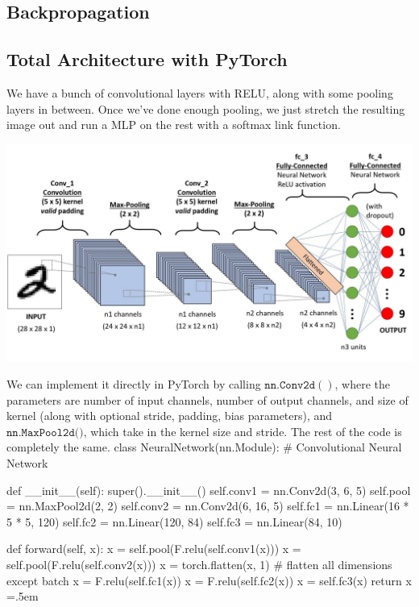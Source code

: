 \documentclass{article}
\newenvironment{cverbatim}
 {\SaveVerbatim{cverb}}
 {\endSaveVerbatim
  \flushleft\fboxrule=0pt\fboxsep=.5em
  \colorbox{cverbbg}{%
    \makebox[\dimexpr\linewidth-2\fboxsep][l]{\BUseVerbatim{cverb}}%
  }
  \endflushleft
}
\theoremstyle{definition}
\theoremstyle{remark}
\theoremstyle{definition}
\begin{document}
\subsection{Backpropagation}


\subsection{Total Architecture with PyTorch}

We have a bunch of convolutional layers with RELU, along with some pooling layers in between. Once we've done enough pooling, we just stretch the resulting image out and run a MLP on the rest with a softmax link function. 
\begin{center}
    \includegraphics[scale=0.25]{Images/CNNs/CNN_architecture.jpeg}
\end{center}

We can implement it directly in PyTorch by calling $\texttt{nn.Conv2d}()$, where the parameters are number of input channels, number of output channels, and size of kernel (along with optional stride, padding, bias parameters), and $\texttt{nn.MaxPool2d()}$, which take in the kernel size and stride. The rest of the code is completely the same. 
\begin{cverbatim}
class NeuralNetwork(nn.Module):
    # Convolutional Neural Network 

    def __init__(self):
        super().__init__()
        self.conv1 = nn.Conv2d(3, 6, 5)
        self.pool = nn.MaxPool2d(2, 2)
        self.conv2 = nn.Conv2d(6, 16, 5)
        self.fc1 = nn.Linear(16 * 5 * 5, 120)
        self.fc2 = nn.Linear(120, 84)
        self.fc3 = nn.Linear(84, 10)


    def forward(self, x):
        x = self.pool(F.relu(self.conv1(x)))
        x = self.pool(F.relu(self.conv2(x)))
        x = torch.flatten(x, 1) # flatten all dimensions except batch
        x = F.relu(self.fc1(x))
        x = F.relu(self.fc2(x))
        x = self.fc3(x)
        return x
\end{cverbatim}
\end{document}
